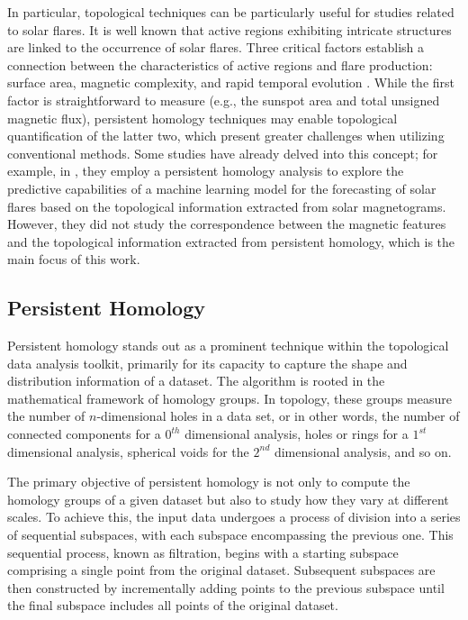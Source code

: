 In particular, topological techniques can be particularly useful for studies related to solar flares. It is well known that active regions exhibiting intricate structures are linked to the occurrence of solar flares. Three critical factors establish a connection between the characteristics of active regions and flare production: surface area, magnetic complexity, and rapid temporal evolution \citep{flare_LR}. While the first factor is straightforward to measure (e.g., the sunspot area and total unsigned magnetic flux), persistent homology techniques may enable topological quantification of the latter two, which present greater challenges when utilizing conventional methods. Some studies have already delved into this concept; for example, in \cite{ph_solar_2}, they employ a persistent homology analysis to explore the predictive capabilities of a machine learning model for the forecasting of solar flares based on the topological information extracted from solar magnetograms. However, they did not study the correspondence between the magnetic features and the topological information extracted from persistent homology, which is the main focus of this work.



\subsection{Persistent Homology}

Persistent homology stands out as a prominent technique within the topological data analysis toolkit, primarily for its capacity to capture the shape and distribution information of a dataset. The algorithm is rooted in the mathematical framework of homology groups. In topology, these groups measure the number of $n$-dimensional holes in a data set, or in other words, the number of connected components for a  $0^{th}$ dimensional analysis, holes or rings for a $1^{st}$ dimensional analysis, spherical voids for the $2^{nd}$ dimensional analysis, and so on. 

The primary objective of persistent homology is not only to compute the homology groups of a given dataset but also to study how they vary at different scales. To achieve this, the input data undergoes a process of division into a series of sequential subspaces, with each subspace encompassing the previous one. This sequential process, known as filtration, begins with a starting subspace comprising a single point from the original dataset. Subsequent subspaces are then constructed by incrementally adding points to the previous subspace until the final subspace includes all points of the original dataset. 

